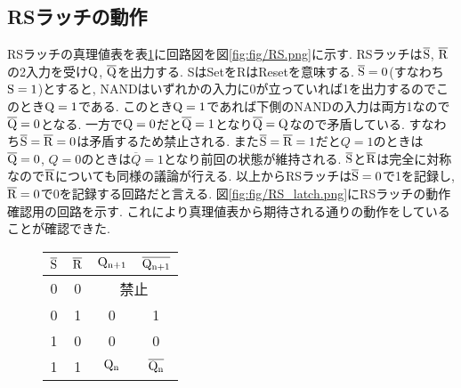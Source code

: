 \subsection{RSラッチの動作}
RSラッチの真理値表を表\ref{tab:rslatch}に回路図を図\ref{fig:fig/RS.png}に示す.
RSラッチは$\rm \overline{S}$, $\rm \overline{R}$の2入力を受け$\rm Q$, $\rm \overline{Q}$を出力する.
SはSetをRはResetを意味する.
$\rm\overline{S}=0$(すなわち$\rm S=1$)とすると,
NANDはいずれかの入力に0が立っていれば1を出力するのでこのとき$\rm Q=1$である.
このとき$\rm Q=1$であれば下側のNANDの入力は両方1なので$\rm\overline{Q}=0$となる.
一方で$\rm Q=0$だと$\rm\overline{Q}=1$となり$\rm\overline{Q}=Q$なので矛盾している.
すなわち$\rm\overline{S}=\overline{R}=0$は矛盾するため禁止される.
また$\rm\overline{S}=\overline{R}=1$だと$Q=1$のときは$\rm\overline{Q}=0$,
$Q=0$のときは$\overline{Q}=1$となり前回の状態が維持される.
$\rm\overline{S}$と$\rm\overline{R}$は完全に対称なので$\rm\overline{R}$についても同様の議論が行える.
以上からRSラッチは$\rm\overline{S}=0$で1を記録し,
$\rm\overline{R}=0$で0を記録する回路だと言える.
図\ref{fig:fig/RS_latch.png}にRSラッチの動作確認用の回路を示す.
これにより真理値表から期待される通りの動作をしていることが確認できた.
\begin{figure}[h]
  \def\@captype{table}
  \begin{minipage}[t]{.48\textwidth}
    \begin{center}
      \begin{tabular}{cccc}
        \hline
        $\rm\overline{S}$ & $\rm\overline{R}$ & $\rm Q_{n+1}$ & $\rm\overline{Q_{n+1}}$\\
        \hline
        0 & 0 & \multicolumn{2}{c}{禁止}\\
        0 & 1 & 0 & 1\\
        1 & 0 & 0 & 0\\
        1 & 1 & $\rm Q_n$ & $\rm \overline{Q_n}$\\
        \hline
      \end{tabular}
    \end{center}
    \label{tab:rslatch}
  \end{minipage}
  \hfill
  \begin{minipage}[c]{.48\textwidth}
  \end{minipage}
\end{figure}
\clearpage
